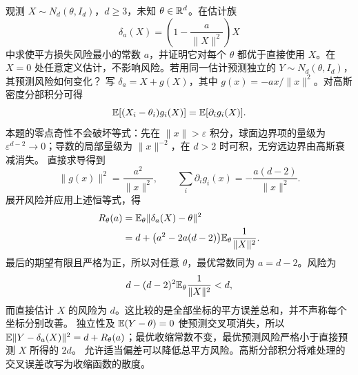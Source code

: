 观测 $X\sim N_d(\theta,I_d)$，$d\ge3$，未知 $\theta\in\mathbb{R}^d$。在估计族
\[
 \delta_a(X)=\left(1-\frac a{\|X\|^2}\right)X
\]
中求使平方损失风险最小的常数 $a$，并证明它对每个 $\theta$ 都优于直接使用 $X$。在 $X=0$ 处任意定义估计，不影响风险。若用同一估计预测独立的 $Y\sim N_d(\theta,I_d)$，其预测风险如何变化？
\solution 写 $\delta_a=X+g(X)$，其中 $g(x)=-ax/\|x\|^2$。对高斯密度分部积分可得
\[
 \mathbb{E}[(X_i-\theta_i)g_i(X)]=\mathbb{E}[\partial_i g_i(X)].
\]
本题的零点奇性不会破坏等式：先在 $\|x\|>\varepsilon$ 积分，球面边界项的量级为 $\varepsilon^{d-2}\to0$；导数的局部量级为 $\|x\|^{-2}$，在 $d>2$ 时可积，无穷远边界由高斯衰减消失。
直接求导得到
\[
 \|g(x)\|^2=\frac{a^2}{\|x\|^2},\qquad
 \sum_i\partial_i g_i(x)=-\frac{a(d-2)}{\|x\|^2}.
\]
展开风险并应用上述恒等式，得
\[
 \begin{aligned}
 R_\theta(a)&=\mathbb{E}_\theta\|\delta_a(X)-\theta\|^2\\
 &=d+\bigl(a^2-2a(d-2)\bigr)
                 \mathbb{E}_\theta\frac1{\|X\|^2}.
 \end{aligned}
\]
最后的期望有限且严格为正，所以对任意 $\theta$，最优常数同为 $a=d-2$。风险为
\[
 d-(d-2)^2\mathbb{E}_\theta\frac1{\|X\|^2}<d,
\]
而直接估计 $X$ 的风险为 $d$。这比较的是全部坐标的平方误差总和，并不声称每个坐标分别改善。
独立性及 $\mathbb{E}(Y-\theta)=0$ 使预测交叉项消失，所以 $\mathbb{E}\|Y-\delta_a(X)\|^2=d+R_\theta(a)$；最优收缩常数不变，最优预测风险严格小于直接预测 $X$ 所得的 $2d$。
\insight 允许适当偏差可以降低总平方风险。高斯分部积分将难处理的交叉误差改写为收缩函数的散度。
